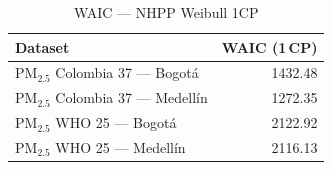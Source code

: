 \begin{table}[htbp]
\centering
\caption{WAIC --- NHPP Weibull 1CP}
\label{tab:nhpp_waic_1cp}
\begin{tabular}{lr}
\toprule
Dataset & WAIC (1\,CP) \\
\midrule
PM$_{2.5}$ Colombia 37 --- Bogot\'{a} & 1432.48 \\
PM$_{2.5}$ Colombia 37 --- Medell\'{i}n & 1272.35 \\
PM$_{2.5}$ WHO 25 --- Bogot\'{a} & 2122.92 \\
PM$_{2.5}$ WHO 25 --- Medell\'{i}n & 2116.13 \\
\bottomrule
\end{tabular}
\end{table}
